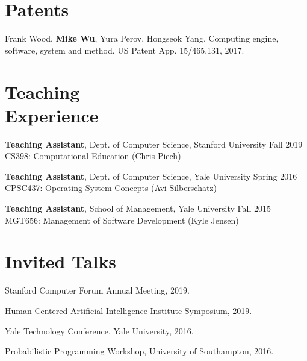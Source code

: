 \documentclass[margin, 10pt]{res} %
\begin{document}
\begin{resume}

\section{Patents}

Frank Wood, \textbf{Mike Wu}, Yura Perov, Hongseok Yang. Computing engine, software, system and method. US Patent App. 15/465,131, 2017.


\section{Teaching \\ Experience}

\textbf{Teaching Assistant}, Dept. of Computer Science, Stanford University \hfill Fall 2019\\
CS398: Computational Education (Chris Piech)

\textbf{Teaching Assistant}, Dept. of Computer Science, Yale University \hfill Spring 2016\\
CPSC437: Operating System Concepts (Avi Silberschatz)

\textbf{Teaching Assistant}, School of Management, Yale University \hfill Fall 2015\\
MGT656: Management of Software Development (Kyle Jensen)


\section{Invited Talks}

Stanford Computer Forum Annual Meeting, 2019.

Human-Centered Artificial Intelligence Institute Symposium, 2019.

Yale Technology Conference, Yale University, 2016.

Probabilistic Programming Workshop, University of Southampton, 2016.


\end{resume}
\end{document}
